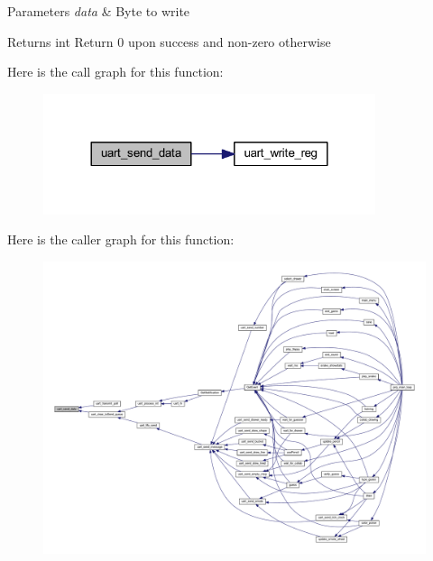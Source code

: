 \begin{DoxyParams}{Parameters}
{\em data} & Byte to write \\
\hline
\end{DoxyParams}
\begin{DoxyReturn}{Returns}
int Return 0 upon success and non-\/zero otherwise 
\end{DoxyReturn}
Here is the call graph for this function\+:\nopagebreak
\begin{figure}[H]
\begin{center}
\leavevmode
\includegraphics[width=276pt]{group__uart_gae1d1c17871aeba317b0582a22006aa94_cgraph}
\end{center}
\end{figure}
Here is the caller graph for this function\+:\nopagebreak
\begin{figure}[H]
\begin{center}
\leavevmode
\includegraphics[width=350pt]{group__uart_gae1d1c17871aeba317b0582a22006aa94_icgraph}
\end{center}
\end{figure}
\mbox{\label{group__uart_ga9ebda6fe7f4118ddcd4e4b527d9e31ef}} 

